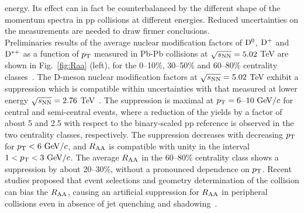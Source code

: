 energy. Its effect can in fact be counterbalanced by the different shape of the momentum
spectra in pp collisions at different energies. Reduced uncertainties
on the measurements are needed to draw firmer conclusions.\\
Preliminaries results of the average nuclear modification factors 
of ${\rm D^0}$, ${\rm D^+}$ and ${\rm D^{*+}}$ as a function of
$p_{\rm T}$ measured in Pb-Pb collisions at $\sqrt{s_{\rm NN}} = 5.02 $ TeV 
are shown in Fig.~\ref{fig:Raa} (left), 
for the 0--10\%, 30--50\% and 60--80\% centrality classes~\cite{ALICE-PUBLIC-2017-003}. 
The D-meson nuclear modification factors at $\sqrt{s_{\rm NN}} = 5.02$ TeV 
exhibit a suppression which is compatible within uncertainties 
with that measured at lower energy $\sqrt{s_{\rm NN}} = 2.76$ TeV~\cite{Adam:2015sza}. 
The suppression is maximal at $p_{\rm T}=6$--$10~\mathrm{GeV}/c$ for central and semi-central events, 
where a reduction of the yields by
a factor of about 5 and 2.5 with respect to the binary-scaled pp reference is observed 
in the two centrality classes, respectively.
The suppression decreases with decreasing $p_{\rm T}$ for $p_{\rm T}<6~\mathrm{GeV}/c$, and 
$R_{\rm AA}$ is compatible with unity  in the interval $1<p_{\rm T}<3~\mathrm{GeV}/c$.
The average $R_{\rm AA}$ in the 60--80\% centrality class shows a suppression 
by about 20--30\%, without a pronounced dependence on $p_{\rm T}$. 
Recent studies proposed that event selections and geometry determination 
of the collision can bias the $R_{\rm AA}$, causing
an artificial suppression for $R_{\rm AA}$ in peripheral collisions even in absence
of jet quenching and shadowing~\cite{Morsch:2017brb}.\\


